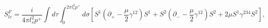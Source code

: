 \begin{equation}
S^F_{lc} = \frac{i}{4 \pi l_s^2 p^+} \int d \tau \int_{0}^{2 \pi l_s^2 p^+} d \sigma
\left[ 
   S^1 \left( \partial_+ - \frac{\mu}{2} \gamma^{12} \right) S^1 +
   S^2 \left( \partial_- - \frac{\mu}{2} \gamma^{12} \right) S^2 +
   2 \mu  S^1 \gamma^{234} S^2 
\right],
\end{equation} 
